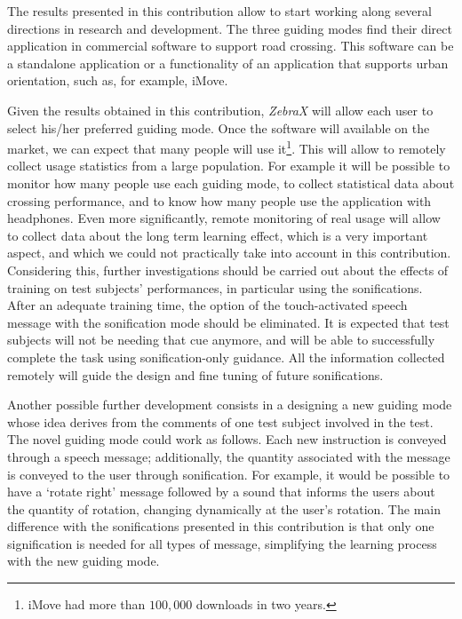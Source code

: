 \documentclass{article}
\newcommand{\zebra}{\emph{ZebraX}}
\begin{document}
The results presented in this contribution allow to start working along several directions in research and development.
The three guiding modes find their direct application in commercial software to support road crossing. This software can be a standalone application or a functionality of an application that supports urban orientation, such as, for example, iMove. 

Given the results obtained in this contribution, \zebra{} will allow each user to select his/her preferred guiding mode.
Once the software will available on the market, we can expect that many people will use it\footnote{iMove had more than $100,000$ downloads in two years.}. This will allow to remotely collect usage statistics from a large population. For example it will be possible to monitor how many people use each guiding mode, to collect statistical data about crossing performance, and to know how many people use the application with headphones.
Even more significantly, remote monitoring of real usage will allow to collect data about the long term learning effect, which is a very important aspect, and which we could not practically take into account in this contribution. 
Considering this, further investigations should be carried out about the effects of training on test subjects' performances, in particular using the sonifications. After an adequate training time, the option of the touch-activated speech message with the sonification mode should be eliminated. It is expected that test subjects will not be needing that cue anymore, and will be able to successfully complete the task using sonification-only guidance.
All the information collected remotely will guide the design and fine tuning of future sonifications.

Another possible further development consists in a designing a new guiding mode whose idea derives from the comments of one test subject involved in the test. The novel guiding mode could work as follows. Each new instruction is conveyed through a speech message; additionally, the quantity associated with the message is conveyed to the user through sonification. For example, it would be possible to have a `rotate right' message followed by a sound that informs the users about the quantity of rotation, changing dynamically at the user's rotation. The main difference with the sonifications presented in this contribution is that only one signification is needed for all types of message, simplifying the learning process with the new guiding mode.
\end{document}
